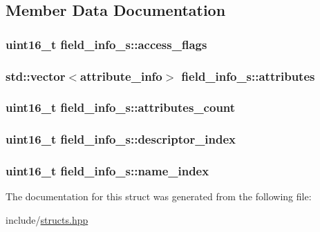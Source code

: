 \subsection{Member Data Documentation}
\hypertarget{structfield__info__s_a51cb65a206e19f1ef167f808fd0dd34a}{
\subsubsection[{access\+\_\+flags}]{\setlength{\rightskip}{0pt plus 5cm}uint16\+\_\+t field\+\_\+info\+\_\+s\+::access\+\_\+flags}}\label{structfield__info__s_a51cb65a206e19f1ef167f808fd0dd34a}
\hypertarget{structfield__info__s_a77c8bf8802039e9dbf1b3b69a55ace29}{
\subsubsection[{attributes}]{\setlength{\rightskip}{0pt plus 5cm}std\+::vector$<${\bf attribute\+\_\+info}$>$ field\+\_\+info\+\_\+s\+::attributes}}\label{structfield__info__s_a77c8bf8802039e9dbf1b3b69a55ace29}
\hypertarget{structfield__info__s_ada4b62d8b973680b456f6c397db8cb11}{
\subsubsection[{attributes\+\_\+count}]{\setlength{\rightskip}{0pt plus 5cm}uint16\+\_\+t field\+\_\+info\+\_\+s\+::attributes\+\_\+count}}\label{structfield__info__s_ada4b62d8b973680b456f6c397db8cb11}
\hypertarget{structfield__info__s_acf1b97dc1bf435aa19f77bc6131a7055}{
\subsubsection[{descriptor\+\_\+index}]{\setlength{\rightskip}{0pt plus 5cm}uint16\+\_\+t field\+\_\+info\+\_\+s\+::descriptor\+\_\+index}}\label{structfield__info__s_acf1b97dc1bf435aa19f77bc6131a7055}
\hypertarget{structfield__info__s_ae6ad0227620df9c8733e10a29b320957}{
\subsubsection[{name\+\_\+index}]{\setlength{\rightskip}{0pt plus 5cm}uint16\+\_\+t field\+\_\+info\+\_\+s\+::name\+\_\+index}}\label{structfield__info__s_ae6ad0227620df9c8733e10a29b320957}


The documentation for this struct was generated from the following file\+:\begin{DoxyCompactItemize}
\item 
include/\hyperlink{structs_8hpp}{structs.\+hpp}\end{DoxyCompactItemize}
